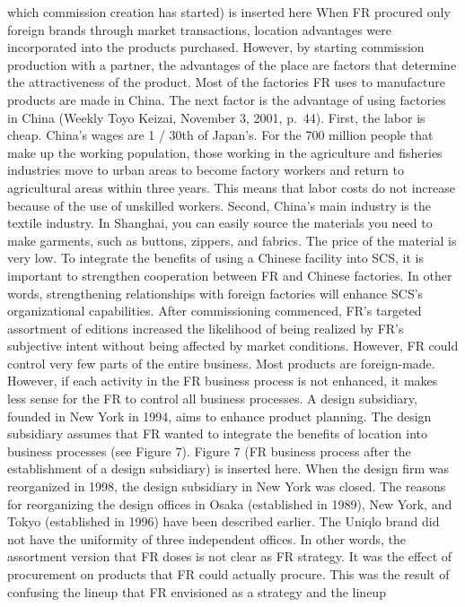 \documentclass[12pt,]{article}
\begin{document}
which commission creation has started) is inserted here When FR procured
only foreign brands through market transactions, location advantages
were incorporated into the products purchased. However, by starting
commission production with a partner, the advantages of the place are
factors that determine the attractiveness of the product. Most of the
factories FR uses to manufacture products are made in China. The next
factor is the advantage of using factories in China (Weekly Toyo Keizai,
November 3, 2001, p.~44). First, the labor is cheap. China's wages are 1
/ 30th of Japan's. For the 700 million people that make up the working
population, those working in the agriculture and fisheries industries
move to urban areas to become factory workers and return to agricultural
areas within three years. This means that labor costs do not increase
because of the use of unskilled workers. Second, China's main industry
is the textile industry. In Shanghai, you can easily source the
materials you need to make garments, such as buttons, zippers, and
fabrics. The price of the material is very low. To integrate the
benefits of using a Chinese facility into SCS, it is important to
strengthen cooperation between FR and Chinese factories. In other words,
strengthening relationships with foreign factories will enhance SCS's
organizational capabilities. After commissioning commenced, FR's
targeted assortment of editions increased the likelihood of being
realized by FR's subjective intent without being affected by market
conditions. However, FR could control very few parts of the entire
business. Most products are foreign-made. However, if each activity in
the FR business process is not enhanced, it makes less sense for the FR
to control all business processes. A design subsidiary, founded in New
York in 1994, aims to enhance product planning. The design subsidiary
assumes that FR wanted to integrate the benefits of location into
business processes (see Figure 7). Figure 7 (FR business process after
the establishment of a design subsidiary) is inserted here. When the
design firm was reorganized in 1998, the design subsidiary in New York
was closed. The reasons for reorganizing the design offices in Osaka
(established in 1989), New York, and Tokyo (established in 1996) have
been described earlier. The Uniqlo brand did not have the uniformity of
three independent offices. In other words, the assortment version that
FR doses is not clear as FR strategy. It was the effect of procurement
on products that FR could actually procure. This was the result of
confusing the lineup that FR envisioned as a strategy and the lineup
\end{document}
